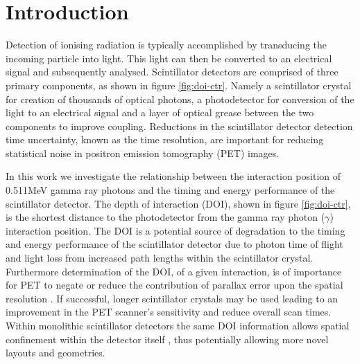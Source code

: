 \section{Introduction} 
Detection of ionising radiation is typically accomplished by transducing the incoming particle into light. This light can then be converted to an electrical signal and subsequently analysed. Scintillator detectors are comprised of three primary components, as shown in figure \ref{fig:doi-ctr}. Namely a scintillator crystal for creation of thousands of optical photons, a photodetector for conversion of the light to an electrical signal and a layer of optical grease between the two components to improve coupling. Reductions in the scintillator detector detection time uncertainty, known as the time resolution, are important for reducing statistical noise in positron emission tomography (PET) images\cite{Moses_Ullisch_2006}.

In this work we investigate the relationship between the interaction position of 0.511MeV gamma ray photons and the timing and energy performance of the scintillator detector. The depth of interaction (DOI), shown in figure \ref{fig:doi-ctr}, is the shortest distance to the photodetector from the gamma ray photon ($\gamma$) interaction position. The DOI is a potential source of degradation to the timing and energy performance of the scintillator detector due to photon time of flight and light loss from increased path lengths within the scintillator crystal. Furthermore determination of the DOI, of a given interaction, is of importance for PET to negate or reduce the contribution of parallax error upon the spatial resolution \cite{Moses_2001}\cite{Humm_Rosenfeld_Del_Guerra_2003}. If successful, longer scintillator crystals may be used leading to an improvement in the PET scanner's sensitivity and reduce overall scan times. Within monolithic scintillator detectors the same DOI information allows spatial confinement within the detector itself \cite{am_Borghi_Seifert_Schaart_2013}\cite{Maas_Bruyndonckx_Schaart_2012}, thus potentially allowing more novel\cite{Dendooven_Lohner_Beekman_2009}\cite{n_der_Lei_van_Dam_Schaart_2013} layouts and geometries.

